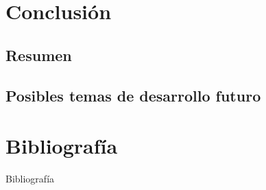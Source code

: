 \documentclass{beamer}
\begin{document}
\section{Conclusión}

\subsection{Resumen}

\subsection{Posibles temas de desarrollo futuro}


\section{Bibliografía}
\begin{frame}[allowframebreaks]{Bibliografía}
    
    
\end{frame}
\end{document}
